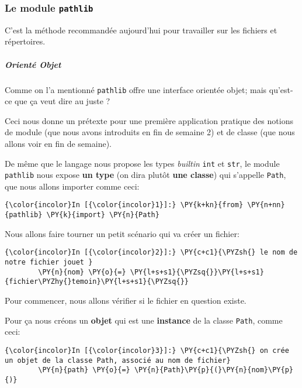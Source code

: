     \hypertarget{le-module-pathlib}{%
\subsubsection{\texorpdfstring{Le module
\texttt{pathlib}}{Le module pathlib}}\label{le-module-pathlib}}

    C'est la méthode recommandée aujourd'hui pour travailler sur les
fichiers et répertoires.

    \hypertarget{orientuxe9-objet}{%
\subparagraph{Orienté Objet}\label{orientuxe9-objet}}

    Comme on l'a mentionné \texttt{pathlib} offre une interface orientée
objet; mais qu'est-ce que ça veut dire au juste ?

Ceci nous donne un prétexte pour une première application pratique des
notions de module (que nous avons introduits en fin de semaine 2) et de
classe (que nous allons voir en fin de semaine).

    De même que le langage nous propose les types \emph{builtin}
\texttt{int} et \texttt{str}, le module \texttt{pathlib} nous expose
\textbf{un type} (on dira plutôt \textbf{une classe}) qui s'appelle
\texttt{Path}, que nous allons importer comme ceci:

    \begin{Verbatim}[commandchars=\\\{\}]
{\color{incolor}In [{\color{incolor}1}]:} \PY{k+kn}{from} \PY{n+nn}{pathlib} \PY{k}{import} \PY{n}{Path}
\end{Verbatim}


    Nous allons faire tourner un petit scénario qui va créer un fichier:

    \begin{Verbatim}[commandchars=\\\{\}]
{\color{incolor}In [{\color{incolor}2}]:} \PY{c+c1}{\PYZsh{} le nom de notre fichier jouet }
        \PY{n}{nom} \PY{o}{=} \PY{l+s+s1}{\PYZsq{}}\PY{l+s+s1}{fichier\PYZhy{}temoin}\PY{l+s+s1}{\PYZsq{}}
\end{Verbatim}


    Pour commencer, nous allons vérifier si le fichier en question existe.

Pour ça nous créons un \textbf{objet} qui est une \textbf{instance} de
la classe \texttt{Path}, comme ceci:

    \begin{Verbatim}[commandchars=\\\{\}]
{\color{incolor}In [{\color{incolor}3}]:} \PY{c+c1}{\PYZsh{} on crée un objet de la classe Path, associé au nom de fichier}
        \PY{n}{path} \PY{o}{=} \PY{n}{Path}\PY{p}{(}\PY{n}{nom}\PY{p}{)}
\end{Verbatim}


